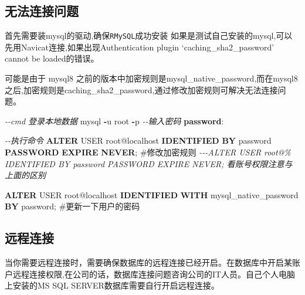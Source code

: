 \documentclass[
]{book}
\newenvironment{Shaded}{\begin{snugshade}}{\end{snugshade}}
\newcommand{\CommentTok}[1]{\textcolor[rgb]{0.56,0.35,0.01}{\textit{#1}}}
\newcommand{\FunctionTok}[1]{\textcolor[rgb]{0.00,0.00,0.00}{#1}}
\newcommand{\KeywordTok}[1]{\textcolor[rgb]{0.13,0.29,0.53}{\textbf{#1}}}
\newcommand{\NormalTok}[1]{#1}
\newcommand{\OperatorTok}[1]{\textcolor[rgb]{0.81,0.36,0.00}{\textbf{#1}}}
\newcommand{\StringTok}[1]{\textcolor[rgb]{0.31,0.60,0.02}{#1}}
\begin{document}
\hypertarget{ux65e0ux6cd5ux8fdeux63a5ux95eeux9898}{%
\subsection{无法连接问题}\label{ux65e0ux6cd5ux8fdeux63a5ux95eeux9898}}

首先需要装mysql的驱动,确保\texttt{RMySQL}成功安装 如果是测试自己安装的mysql,可以先用Navicat连接,如果出现Authentication plugin `caching\_sha2\_password' cannot be loaded的错误。

可能是由于 mysql8 之前的版本中加密规则是mysql\_native\_password,而在mysql8之后,加密规则是caching\_sha2\_password,通过修改加密规则可解决无法连接问题。

\begin{Shaded}
\begin{Highlighting}[]

\CommentTok{{-}{-}cmd 登录本地数据}
\NormalTok{mysql }\OperatorTok{{-}}\NormalTok{u root }\OperatorTok{{-}}\NormalTok{p}
\CommentTok{{-}{-}输入密码}
\KeywordTok{password}\NormalTok{: }

\CommentTok{{-}{-}执行命令}
\KeywordTok{ALTER} \FunctionTok{USER} \StringTok{\textquotesingle{}root\textquotesingle{}}\NormalTok{@}\StringTok{\textquotesingle{}localhost\textquotesingle{}} \KeywordTok{IDENTIFIED} \KeywordTok{BY} \StringTok{\textquotesingle{}password\textquotesingle{}} \KeywordTok{PASSWORD} \KeywordTok{EXPIRE} \KeywordTok{NEVER}\NormalTok{;   \#修改加密规则 }
\CommentTok{{-}{-}{-}ALTER USER \textquotesingle{}root\textquotesingle{}@\textquotesingle{}\%\textquotesingle{} IDENTIFIED BY \textquotesingle{}password\textquotesingle{} PASSWORD EXPIRE NEVER; 看账号权限注意与上面的区别}

\KeywordTok{ALTER} \FunctionTok{USER} \StringTok{\textquotesingle{}root\textquotesingle{}}\NormalTok{@}\StringTok{\textquotesingle{}localhost\textquotesingle{}} \KeywordTok{IDENTIFIED} \KeywordTok{WITH}\NormalTok{ mysql\_native\_password }\KeywordTok{BY} \StringTok{\textquotesingle{}password\textquotesingle{}}\NormalTok{; \#更新一下用户的密码 }
\end{Highlighting}
\end{Shaded}

\hypertarget{ux8fdcux7a0bux8fdeux63a5}{%
\subsection{远程连接}\label{ux8fdcux7a0bux8fdeux63a5}}

当你需要远程连接时，需要确保数据库的远程连接已经开启。在数据库中开启某账户远程连接权限,在公司的话，数据库连接问题咨询公司的IT人员。自己个人电脑上安装的MS SQL SERVER数据库需要自行开启远程连接。
\end{document}
